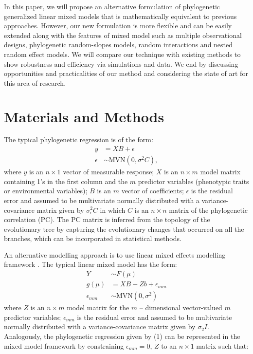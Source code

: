 In this paper, we will propose an alternative formulation of phylogenetic generalized linear mixed models that is mathematically equivalent to previous approaches.
However, our new formulation is more flexible and can be easily extended along with the features of mixed model such as multiple observational designs, phylogenetic random-slopes models, random interactions  and nested random effect models.
We will compare our technique with existing methods to show robustness and efficiency via simulations and data.
We end by discussing opportunities and practicalities of our method and considering the state of art for this area of research. 

\section{Materials and Methods}

The typical phylogenetic regression is of the form:
\begin{align}
y & = XB + \epsilon \label{eq:gls1} \\ 
\epsilon & \sim \textrm{MVN}(0,\sigma^{2}C), \label{eq:gls2}
\end{align}
where $y$ is an $n \times 1$ vector of measurable response; $X$ is an $n \times m$ model matrix containing 1's in the first column and the $m$ predictor variables (phenotypic traits or environmental variables); $B$ is an $m$ vector of coefficients; $\epsilon$ is the residual error and assumed to be multivariate normally distributed with a variance-covariance matrix given by $\sigma^{2}_{\epsilon}C$ in which $C$ is an $n \times n$ matrix of the phylogenetic correlation (PC).
The PC matrix is inferred from the topology of the evolutionary tree by capturing the evolutionary changes that occurred on all the branches, which can be incorporated in statistical methods.

An alternative modelling approach is to use linear mixed effects modelling framework \citep{lynch1991methods}.
The typical linear mixed model has the form:
\begin{align}
Y & \sim F(\mu) \label{eq:glmm1} \\
g(\mu) & = XB + Zb + \epsilon_{mm} \label{eq:glmm2} \\
\epsilon_{mm} & \sim \textrm{MVN}(0,\sigma^2) \label{eq:glmm3}
\end{align}
where $Z$ is an $n \times m$ model matrix for the $m$ -- dimensional vector-valued $m$ predictor variables; $\epsilon_{mm}$ is the residual error and assumed to be multivariate normally distributed with a variance-covariance matrix given by $\sigma_{2}I$.
Analogously, the phylogenetic regression given by (1) can be represented in the mixed model framework by constraining $\epsilon_{mm} = 0$, $Z$ to an $n \times 1$ matrix such that: 


